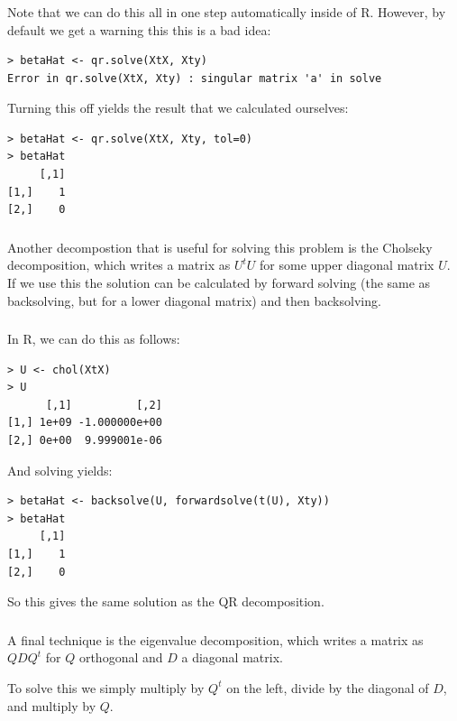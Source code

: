 \begin{frame}[fragile] \frametitle{}

Note that we can do this all in one step automatically inside
of R. However, by default we get a warning this this is a bad
idea:
\begin{verbatim}
> betaHat <- qr.solve(XtX, Xty)
Error in qr.solve(XtX, Xty) : singular matrix 'a' in solve
\end{verbatim}
\pause Turning this off yields the result that we calculated
ourselves:
\begin{verbatim}
> betaHat <- qr.solve(XtX, Xty, tol=0)
> betaHat
     [,1]
[1,]    1
[2,]    0
\end{verbatim}

\end{frame}

\begin{frame}[fragile] \frametitle{}

Another decompostion that is useful for solving this
problem is the Cholseky decomposition, which writes
a matrix as $U^t U$ for some upper diagonal matrix $U$.
If we use this the solution can be calculated by forward
solving (the same as backsolving, but for a lower diagonal
matrix) and then backsolving.

\end{frame}

\begin{frame}[fragile] \frametitle{}

In R, we can do this as follows:
\begin{verbatim}
> U <- chol(XtX)
> U
      [,1]          [,2]
[1,] 1e+09 -1.000000e+00
[2,] 0e+00  9.999001e-06
\end{verbatim}
And solving yields:
\begin{verbatim}
> betaHat <- backsolve(U, forwardsolve(t(U), Xty))
> betaHat
     [,1]
[1,]    1
[2,]    0
\end{verbatim}
\pause So this gives the same solution as the QR decomposition.

\end{frame}

\begin{frame}[fragile] \frametitle{}

A final technique is the eigenvalue decomposition, which
writes a matrix as $Q D Q^t$ for $Q$ orthogonal and
$D$ a diagonal matrix.

\pause To solve this we simply multiply by $Q^t$ on the left,
divide by the diagonal of $D$, and multiply by $Q$.

\end{frame}

